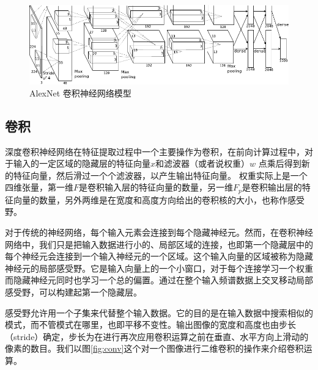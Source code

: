   

\begin{figure}
  \centering
  \includegraphics[width=\textwidth]{figures/networks/alexnetarchitecture}
  \caption{ AlexNet 卷积神经网络模型\cite{krizhevsky2012imagenet}}
  \label{fig:cnn_network}  
\end{figure}

\subsection{卷积}

深度卷积神经网络在特征提取过程中一个主要操作为卷积，在前向计算过程中，对于输入的一定区域的隐藏层的特征向量$x$和滤波器（或者说权重）$w$ 点乘后得到新的特征向量，然后滑过一个个滤波器，以产生输出特征向量。
权重实际上是一个四维张量，第一维$ F $是卷积输入层的特征向量的数量，另一维$ F_p $是卷积输出层的特征向量的数量，另外两维是在宽度和高度方向给出的卷积核的大小，也称作感受野。

对于传统的神经网络，每个输入元素会连接到每个隐藏神经元。然而，在卷积神经网络中，我们只是把输入数据进行小的、局部区域的连接，也即第一个隐藏层中的每个神经元会连接到一个输入神经元的一个区域。这个输入向量的区域被称为隐藏神经元的局部感受野。它是输入向量上的一个小窗口，对于每个连接学习一个权重而隐藏神经元同时也学习一个总的偏置。通过在整个输入频谱数据上交叉移动局部感受野，可以构建起第一个隐藏层。

感受野允许用一个子集来代替整个输入数据。它的目的是在输入数据中搜索相似的模式，而不管模式在哪里，也即平移不变性。输出图像的宽度和高度也由步长（stride）确定，步长为在进行再次应用卷积运算之前在垂直、水平方向上滑动的像素的数目。我们以图\ref{fig:conv}这个对一个图像进行二维卷积的操作来介绍卷积运算。

